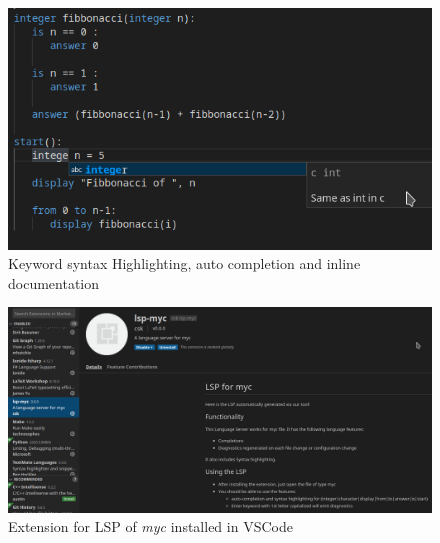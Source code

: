 \ifmyc%
\begin{figure}
    \includegraphics[width=\linewidth]{../fig/myc.png}
    \caption{Keyword syntax Highlighting, auto completion and inline documentation}
    \label{myc}
\end{figure}
\fi%

\ifmycext%
\begin{figure}
    \includegraphics[width=\linewidth]{../fig/mycext.png}
    \caption{Extension for LSP of {\it myc} installed in VSCode}
    \label{mycext}
\end{figure}
\fi%